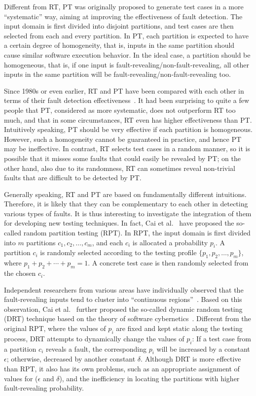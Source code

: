 \documentclass[10pt,journal,compsoc]{IEEEtran}
\begin{document}
Different from RT, PT was originally proposed to generate test cases in a more ``systematic'' way, aiming at improving the effectiveness of fault detection. The input domain is first divided into disjoint partitions, and test cases are then selected from each and every partition. In PT, each partition is expected to have a certain degree of homogeneity, that is, inputs in the same partition should cause similar software execution behavior. In the ideal case, a partition should be homogeneous, that is, if one input is fault-revealing/non-fault-revealing, all other inputs in the same partition will be fault-revealing/non-fault-revealing too.

Since 1980s or even earlier, RT and PT have been compared with each other in terms of their fault detection effectiveness~\cite{Hamlet90, ChenTSE94, ChenTSE96, Gutjahr99}. It had been surprising to quite a few people that PT, considered as more systematic, does not outperform RT too much, and that in some circumstances, RT even has higher effectiveness than PT. Intuitively speaking, PT should be very effective if each partition is homogeneous. However, such a homogeneity cannot be guaranteed in practice, and hence PT may be ineffective. In contrast, RT selects test cases in a random manner, so it is possible that it misses some faults that could easily be revealed by PT; on the other hand, also due to its randomness, RT can sometimes reveal non-trivial faults that are difficult to be detected by PT.

Generally speaking, RT and PT are based on fundamentally different intuitions. Therefore, it is likely that they can be complementary to each other in detecting various types of faults. It is thus interesting to investigate the integration of them for developing new testing techniques. In fact, Cai et al.~\cite{Cai05, Cai07} have proposed the so-called random partition testing (RPT). In RPT, the input domain is first divided into $m$ partitions $c_1, c_2, \ldots, c_m$, and each $c_i$ is allocated a probability $p_i$. A partition $c_i$ is randomly selected according to the testing profile $\{p_1, p_2, \ldots, p_m\}$, where $p_1 + p_2 + \cdots +p_m = 1$. A concrete test case is then randomly selected from the chosen $c_i$.

Independent researchers from various areas have individually observed that the fault-revealing inputs tend to cluster into ``continuous regions''~\cite{Ammann88, Finelli91}. Based on this observation, Cai et al.~\cite{Cai09} further proposed the so-called dynamic random testing (DRT) technique based on the theory of software cybernetics~\cite{Cai02}. Different from the original RPT, where the values of $p_i$ are fixed and kept static along the testing process, DRT attempts to dynamically change the values of $p_i$: If a test case from a partition $c_i$ reveals a fault, the corresponding $p_i$ will be increased by a constant $\epsilon$; otherwise, decreased by another constant $\delta$. Although DRT is more effective than RPT, it also has its own problems, such as an appropriate assignment of values for ($\epsilon$ and $\delta$), and the inefficiency in locating the partitions with higher fault-revealing probability.
\end{document}
